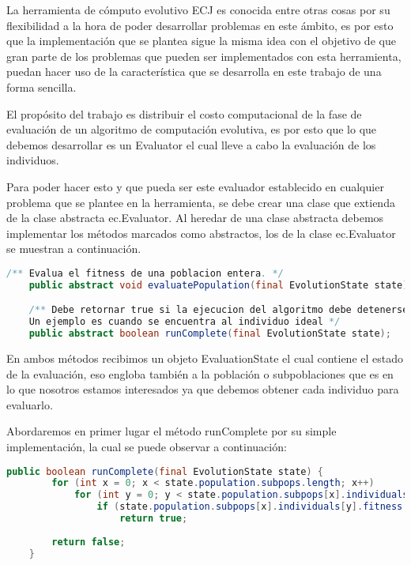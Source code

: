 La herramienta de c\'omputo evolutivo ECJ es conocida entre otras cosas por su flexibilidad a la hora de poder desarrollar problemas en este ámbito, es por esto que la implementación que se plantea sigue la misma idea con el objetivo de que gran parte de los problemas que pueden ser implementados con esta herramienta, puedan hacer uso de la característica que se desarrolla en este trabajo de una forma sencilla.
\label{desarrollo-implementacion}

El propósito del trabajo es distribuir el costo computacional de la fase de evaluación de un algoritmo de computación evolutiva, es por esto que lo que debemos desarrollar es un Evaluator  el cual lleve a cabo la evaluación de los individuos.

Para poder hacer esto y que pueda ser este evaluador establecido en cualquier problema que se plantee en la herramienta, se debe crear una clase que extienda de la clase abstracta ec.Evaluator. Al heredar de una clase abstracta debemos implementar los métodos marcados como abstractos, los de la clase ec.Evaluator se muestran a continuación.

\begin{lstlisting}[language=Java]
    /** Evalua el fitness de una poblacion entera. */
    public abstract void evaluatePopulation(final EvolutionState state);

    /** Debe retornar true si la ejecucion del algoritmo debe detenerse por algun motivo.
    Un ejemplo es cuando se encuentra al individuo ideal */
    public abstract boolean runComplete(final EvolutionState state);
\end{lstlisting}

En ambos métodos recibimos un objeto EvaluationState el cual contiene el estado de la evaluación, eso engloba también a la población o subpoblaciones que es en lo que nosotros estamos interesados ya que debemos obtener cada individuo para evaluarlo.

Abordaremos en primer lugar el método runComplete por su simple implementación, la cual se puede observar a continuación:

\begin{lstlisting}[language=Java]
	public boolean runComplete(final EvolutionState state) {
		for (int x = 0; x < state.population.subpops.length; x++)
			for (int y = 0; y < state.population.subpops[x].individuals.length; y++)
				if (state.population.subpops[x].individuals[y].fitness.isIdealFitness())
					return true;
		
		return false;
	}
\end{lstlisting}

